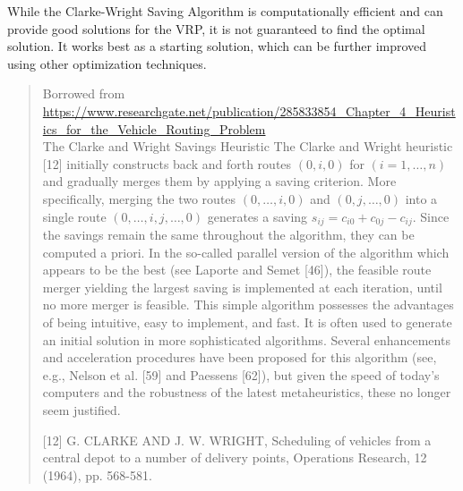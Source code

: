 While the Clarke-Wright Saving Algorithm is computationally efficient and can provide good solutions for the VRP, it is not guaranteed to find the optimal solution. It works best as a starting solution, which can be further improved using other optimization techniques.



\begin{quote}
Borrowed from \url{https://www.researchgate.net/publication/285833854_Chapter_4_Heuristics_for_the_Vehicle_Routing_Problem} \\

The Clarke and Wright Savings Heuristic
The Clarke and Wright heuristic [12] initially constructs back and forth routes $(0, i, 0)$ for $(i=1, \ldots, n)$ and gradually merges them by applying a saving criterion. More specifically, merging the two routes $(0, \ldots, i, 0)$ and $(0, j, \ldots, 0)$ into a single route $(0, \ldots, i, j, \ldots, 0)$ generates a saving $s_{i j}=c_{i 0}+c_{0 j}-c_{i j}$. Since the savings remain the same throughout the algorithm, they can be computed a priori. In the so-called parallel version of the algorithm which appears to be the best (see Laporte and Semet [46]), the feasible route merger yielding the largest saving is implemented at each iteration, until no more merger is feasible. This simple algorithm possesses the advantages of being intuitive, easy to implement, and fast. It is often used to generate an initial solution in more sophisticated algorithms. Several enhancements and acceleration procedures have been proposed for this algorithm (see, e.g., Nelson et al. [59] and Paessens [62]), but given the speed of today's computers and the robustness of the latest metaheuristics, these no longer seem justified.

[12] G. CLARKE AND J. W. WRIGHT, Scheduling of vehicles from a central depot to a number of delivery points, Operations Research, 12 (1964), pp. 568-581.
\end{quote}




